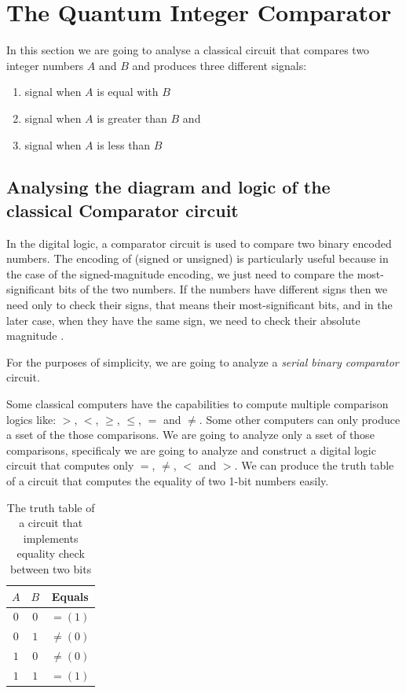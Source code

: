 \section{The Quantum Integer Comparator}

In this section we are going to analyse a classical circuit that compares two integer numbers
$A$ and $B$ and produces three different signals:

\begin{enumerate}
    \item signal when $A$ is equal with $B$
    \item signal when $A$ is greater than $B$ and
    \item signal when $A$ is less than $B$
\end{enumerate}

\subsection{Analysing the diagram and logic of the classical Comparator circuit}

In the digital logic, a comparator circuit is used to compare two binary encoded numbers. The encoding of (signed or unsigned)
is particularly useful because in the case of the signed-magnitude encoding, we just need to compare the most-significant bits
of the two numbers. If the numbers have different signs then we need only to check their signs, that means their most-significant
bits, and in the later case, when they have the same sign, we need to check their absolute magnitude \cite{Giannakopoulos2015}.

For the purposes of simplicity, we are going to analyze a \textit{serial binary comparator} circuit.

Some classical computers have the capabilities to compute multiple comparison logics like: $>$, $<$, $\ge$, $\le$, $=$ and $\neq$.
Some other computers can only produce a sset of the those comparisons. We are going to analyze only a sset of those comparisons,
specificaly we are going to analyze and construct a digital logic circuit that computes only $=$, $\neq$, $<$ and $>$.
We can produce the truth table of a circuit that computes the equality of two 1-bit numbers easily.

\begin{table}[ht]
    \centering
    \begin{tabular}{cc|c}
        $A$ & $B$ & Equals \\
        \hline
        $0$ & $0$ & $=(1)$ \\
        $0$ & $1$ & $\neq(0)$ \\
        $1$ & $0$ & $\neq(0)$ \\
        $1$ & $1$ & $=(1)$ \\
    \end{tabular}
    \caption{The truth table of a circuit that implements equality check between two bits}
\end{table}

